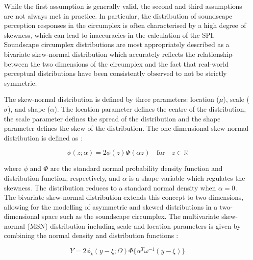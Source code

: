 \documentclass[
  authoryear,
  preprint,
  3p]{elsarticle}
\begin{document}
While the first assumption is generally valid, the second and third
assumptions are not always met in practice. In particular, the
distribution of soundscape perception responses in the circumplex is
often characterised by a high degree of skewness, which can lead to
inaccuracies in the calculation of the SPI. Soundscape circumplex
distributions are most appropriately described as a bivariate
skew-normal distribution \citep{Azzalini2005Skew} which accurately
reflects the relationship between the two dimensions of the circumplex
and the fact that real-world perceptual distributions have been
consistently observed to not be strictly symmetric.

The skew-normal distribution is defined by three parameters: location
(\(\mu\)), scale (\(\sigma\)), and shape (\(\alpha\)). The location
parameter defines the centre of the distribution, the scale parameter
defines the spread of the distribution and the shape parameter defines
the skew of the distribution. The one-dimensional skew-normal
distribution is defined as \citep{Azzalini1996Multivariate}:

\[
\phi(z; \alpha) = 2 \phi(z) \Phi(\alpha z) \quad \text{for} \quad z \in \mathbb{R}
\]

where \(\phi\) and \(\Phi\) are the standard normal probability density
function and distribution function, respectively, and \(\alpha\) is a
shape variable which regulates the skewness. The distribution reduces to
a standard normal density when \(\alpha = 0\). The bivariate skew-normal
distribution extends this concept to two dimensions, allowing for the
modelling of asymmetric and skewed distributions in a two-dimensional
space such as the soundscape circumplex. The multivariate skew-normal
(MSN) distribution including scale and location parameters is given by
combining the normal density and distribution functions
\citep{Azzalini1999Statistical}:

\[
Y = 2 \phi_k (y-\xi; \Omega) \Phi\{\alpha^T\omega^{-1}(y-\xi)\} 
\]
\end{document}
